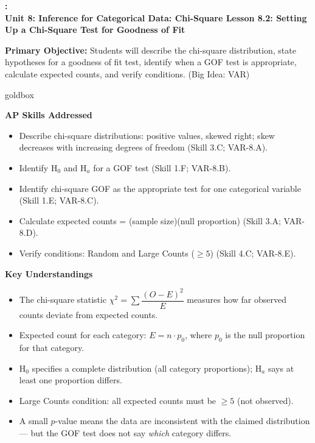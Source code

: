 \documentclass[10pt]{article}
\newcommand{\UnitNumberName}{Unit 8: Inference for Categorical Data: Chi-Square \quad}
\newcommand{\LessonNumberName}{Lesson 8.2: Setting Up a Chi-Square Test for Goodness of Fit}
\begin{document}
\begin{center}
    {\Large\bfseries \CourseName: \SchoolYear \\
    {\small\bfseries \UnitNumberName \LessonNumberName}}
\end{center}

\begin{tcolorbox}[colback=sky, colframe=navy, boxrule=0.9pt, arc=2mm,
    left=2mm, right=2mm, top=1.5mm, bottom=1.5mm]
    \textbf{Primary Objective:} Students will describe the chi-square distribution, state
    hypotheses for a goodness of fit test, identify when a GOF test is appropriate, calculate
    expected counts, and verify conditions. (Big Idea: VAR)
\end{tcolorbox}

\renewcommand{\arraystretch}{1.6}
\begin{skillbox}{goldbox}
\begin{minipage}[t]{0.48\linewidth}
    \textbf{AP Skills Addressed}
    \begin{itemize}
        \item Describe chi-square distributions: positive values, skewed right; skew
              decreases with increasing degrees of freedom (Skill 3.C; VAR-8.A).
        \item Identify H$_0$ and H$_a$ for a GOF test (Skill 1.F; VAR-8.B).
        \item Identify chi-square GOF as the appropriate test for one categorical variable
              (Skill 1.E; VAR-8.C).
        \item Calculate expected counts = (sample size)(null proportion) (Skill 3.A; VAR-8.D).
        \item Verify conditions: Random and Large Counts ($\ge 5$) (Skill 4.C; VAR-8.E).
    \end{itemize}
\end{minipage}
\hfill
\begin{minipage}[t]{0.48\linewidth}
    \textbf{Key Understandings}
    \begin{itemize}
        \item The chi-square statistic $\chi^2 = \sum \dfrac{(O - E)^2}{E}$ measures
              how far observed counts deviate from expected counts.
        \item Expected count for each category: $E = n \cdot p_0$, where $p_0$ is the
              null proportion for that category.
        \item H$_0$ specifies a complete distribution (all category proportions); H$_a$
              says at least one proportion differs.
        \item Large Counts condition: all expected counts must be $\ge 5$ (not observed).
        \item A small $p$-value means the data are inconsistent with the claimed
              distribution --- but the GOF test does not say \emph{which} category differs.
    \end{itemize}
\end{minipage}
\end{skillbox}
\end{document}
